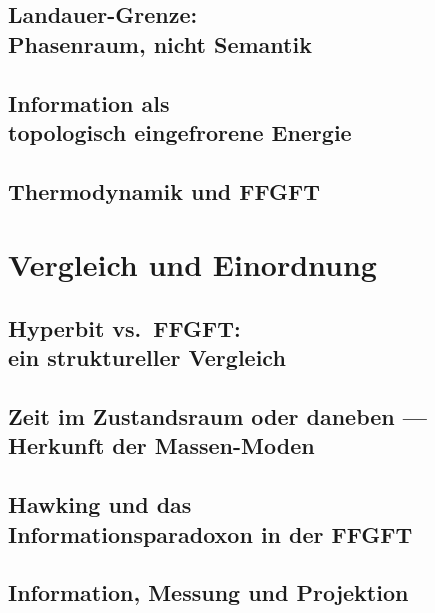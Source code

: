 \documentclass[11pt,twoside,openright]{book}
\theoremstyle{plain}
\theoremstyle{definition}
\begin{document}
\chapter[Landauer-Grenze: Phasenraum, nicht Semantik]{Landauer-Grenze:\\
Phasenraum, nicht Semantik}


\chapter[Information als eingefrorene Energie]{Information als\\
topologisch eingefrorene Energie}


\chapter{Thermodynamik und FFGFT}


\part{Vergleich und Einordnung}

\chapter[Hyperbit vs.\ FFGFT]{Hyperbit vs.\ FFGFT:\\
ein struktureller Vergleich}


\chapter[Zeit im Zustandsraum]{Zeit im Zustandsraum oder daneben ---\\
Herkunft der Massen-Moden}


\chapter[Hawking und das Informationsparadoxon]{Hawking und das\\
Informationsparadoxon in der FFGFT}


\chapter{Information, Messung und Projektion}

\end{document}
